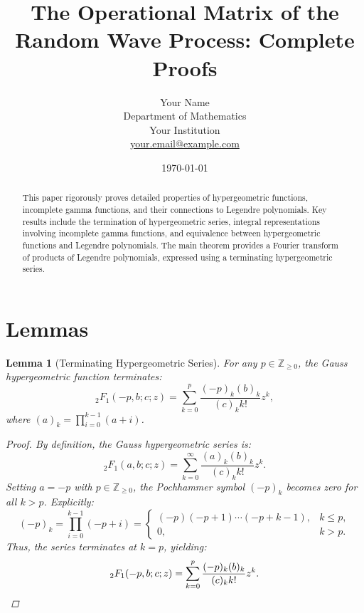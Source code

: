 \documentclass[12pt]{article}
\title{The Operational Matrix of the Random Wave Process: Complete Proofs}
\author{Your Name \\ Department of Mathematics \\ Your Institution \\ \href{mailto:your.email@example.com}{your.email@example.com}}
\date{\today}
\newtheorem{lemma}[theorem]{Lemma}
\begin{document}
\maketitle

\begin{abstract}
This paper rigorously proves detailed properties of hypergeometric functions, incomplete gamma functions, and their connections to Legendre polynomials. Key results include the termination of hypergeometric series, integral representations involving incomplete gamma functions, and equivalence between hypergeometric functions and Legendre polynomials. The main theorem provides a Fourier transform of products of Legendre polynomials, expressed using a terminating hypergeometric series. 
\end{abstract}

\tableofcontents


\section{Lemmas}

\begin{lemma}[Terminating Hypergeometric Series]\label{lem:HyperExpansions}
For any \( p \in \mathbb{Z}_{\geq 0} \), the Gauss hypergeometric function terminates:
\[
{}_2F_1(-p, b; c; z) = \sum_{k=0}^p \frac{(-p)_k (b)_k}{(c)_k k!} z^k,
\]
where \((a)_k = \prod_{i=0}^{k-1}(a+i)\).

\begin{proof}
By definition, the Gauss hypergeometric series is:
\[
{}_2F_1(a, b; c; z) = \sum_{k=0}^\infty \frac{(a)_k (b)_k}{(c)_k k!} z^k.
\]
Setting \( a = -p \) with \( p \in \mathbb{Z}_{\geq 0} \), the Pochhammer symbol \( (-p)_k \) becomes zero for all \( k > p \). Explicitly:
\[
(-p)_k = \prod_{i=0}^{k-1} (-p + i) = 
\begin{cases}
(-p)(-p+1)\cdots(-p + k -1), & k \leq p, \\
0, & k > p.
\end{cases}
\]
Thus, the series terminates at \( k = p \), yielding:
\[
{}_2F_1(-p, b; c; z) = \sum_{k=0}^p \frac{(-p)_k (b)_k}{(c)_k k!} z^k. \qedhere
\]
\end{proof}
\end{lemma}

\end{document}
